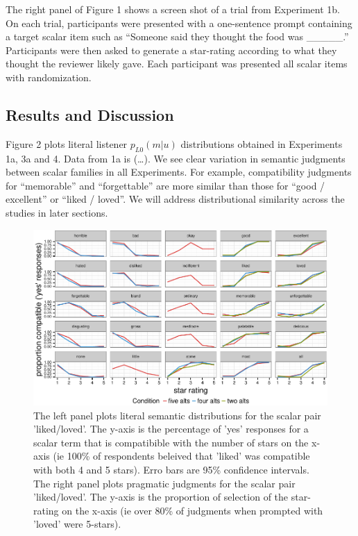 \documentclass[10pt, letterpaper]{article}
\newenvironment{CodeChunk}{}{}
\begin{document}
The right panel of Figure 1 shows a screen shot of a trial from
Experiment 1b. On each trial, participants were presented with a
one-sentence prompt containing a target scalar item such as ``Someone
said they thought the food was \_\_\_\_\_.'' Participants were then
asked to generate a star-rating according to what they thought the
reviewer likely gave. Each participant was presented all scalar items
with randomization.

\subsection{Results and Discussion}\label{results-and-discussion}

Figure 2 plots literal listener \(p_{L0}(m|u)\) distributions obtained
in Experiments 1a, 3a and 4. Data from 1a is (\ldots{}). We see clear
variation in semantic judgments between scalar families in all
Experiments. For example, compatibility judgments for ``memorable'' and
``forgettable'' are more similar than those for ``good / excellent'' or
``liked / loved''. We will address distributional similarity across the
studies in later sections.

\begin{CodeChunk}
\begin{figure}[t]

{\centering \includegraphics{figs/exp1Plots-1} 

}

\caption[The left panel plots literal semantic distributions for the scalar pair 'liked/loved']{The left panel plots literal semantic distributions for the scalar pair 'liked/loved'. The y-axis is the percentage of 'yes' responses for a scalar term that is compatibible with the number of stars on the x-axis (ie 100\% of respondents beleived that 'liked' was compatible with both 4 and 5 stars). Erro bars are 95\% confidence intervals. The right panel plots pragmatic judgments for the scalar pair 'liked/loved'. The y-axis is the proportion of selection of the star-rating on the x-axis (ie over 80\% of judgments when prompted with 'loved' were 5-stars).}\label{fig:exp1Plots}
\end{figure}
\end{CodeChunk}
\end{document}
